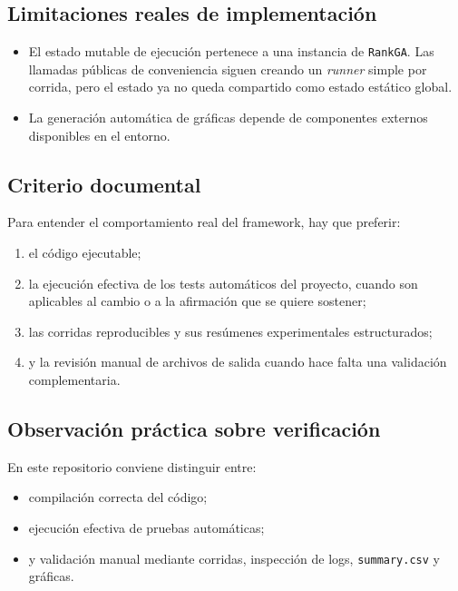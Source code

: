 \documentclass[11pt]{article}
\begin{document}
\subsection{Limitaciones reales de implementaci\'on}

\begin{itemize}
  \item El estado mutable de ejecuci\'on pertenece a una instancia de
  \texttt{RankGA}. Las llamadas p\'ublicas de conveniencia siguen creando un
  \emph{runner} simple por corrida, pero el estado ya no queda compartido como
  estado est\'atico global.
  \item La generaci\'on autom\'atica de gr\'aficas depende de componentes
  externos disponibles en el entorno.
\end{itemize}

\subsection{Criterio documental}

Para entender el comportamiento real del framework, hay que preferir:

\begin{enumerate}
  \item el c\'odigo ejecutable;
  \item la ejecuci\'on efectiva de los tests autom\'aticos del proyecto, cuando
  son aplicables al cambio o a la afirmaci\'on que se quiere sostener;
  \item las corridas reproducibles y sus res\'umenes experimentales
  estructurados;
  \item y la revisi\'on manual de archivos de salida cuando hace falta una
  validaci\'on complementaria.
\end{enumerate}

\subsection{Observaci\'on pr\'actica sobre verificaci\'on}

En este repositorio conviene distinguir entre:

\begin{itemize}
  \item compilaci\'on correcta del c\'odigo;
  \item ejecuci\'on efectiva de pruebas autom\'aticas;
  \item y validaci\'on manual mediante corridas, inspecci\'on de logs,
  \texttt{summary.csv} y gr\'aficas.
\end{itemize}
\end{document}
